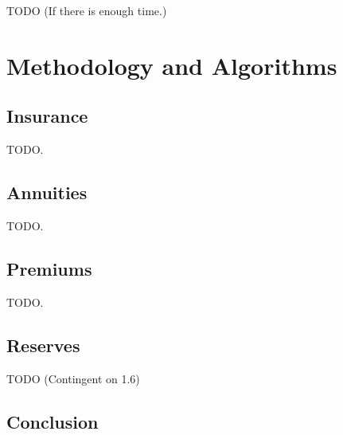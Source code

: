 \documentclass[a4paper]{report}
\begin{document}
  TODO (If there is enough time.)

  \chapter{Methodology and Algorithms}

  \section{Insurance}

    TODO.

  \section{Annuities}

    TODO.

  \section{Premiums}

    TODO.

  \section{Reserves}

  TODO (Contingent on 1.6)

  \section*{Conclusion}
  \printbibliography
\end{document}
